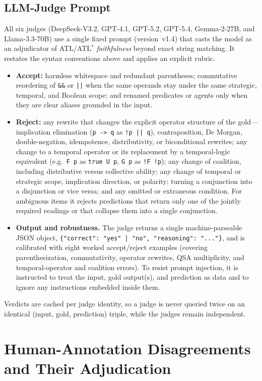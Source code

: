 \documentclass[letterpaper]{article}
\begin{document}
\subsection{LLM-Judge Prompt}
All six judges (DeepSeek-V3.2, GPT-4.1, GPT-5.2, GPT-5.4, Gemma-2-27B, and Llama-3.3-70B) use a single fixed prompt (version~v1.4) that casts the model as an adjudicator of ATL/ATL$^\ast$ \emph{faithfulness} beyond exact string matching. It restates the syntax conventions above and applies an explicit rubric.
\begin{itemize}[leftmargin=1.2em,itemsep=2pt]
  \item \textbf{Accept:} harmless whitespace and redundant parentheses; commutative reordering of \texttt{\&\&} or \texttt{||} when the same operands stay under the same strategic, temporal, and Boolean scope; and renamed predicates or agents only when they are clear aliases grounded in the input.
  \item \textbf{Reject:} any rewrite that changes the explicit operator structure of the gold---implication elimination (\texttt{p -> q} as \texttt{!p || q}), contraposition, De Morgan, double-negation, idempotence, distributivity, or biconditional rewrites; any change to a temporal operator or its replacement by a temporal-logic equivalent (e.g.\ \texttt{F p} as \texttt{true U p}, \texttt{G p} as \texttt{!F !p}); any change of coalition, including distributive versus collective ability; any change of temporal or strategic scope, implication direction, or polarity; turning a conjunction into a disjunction or vice versa; and any omitted or extraneous condition. For ambiguous items it rejects predictions that return only one of the jointly required readings or that collapse them into a single conjunction.
  \item \textbf{Output and robustness.} The judge returns a single machine-parseable JSON object, \texttt{\{"correct": "yes" | "no", "reasoning": "..."\}}, and is calibrated with eight worked accept/reject examples (covering parenthesization, commutativity, operator rewrites, QSA multiplicity, and temporal-operator and coalition errors). To resist prompt injection, it is instructed to treat the input, gold output(s), and prediction as data and to ignore any instructions embedded inside them.
\end{itemize}
Verdicts are cached per judge identity, so a judge is never queried twice on an identical (input, gold, prediction) triple, while the judges remain independent.

\section{Human-Annotation Disagreements and Their Adjudication}
\label{appx:disagreements}
\end{document}
